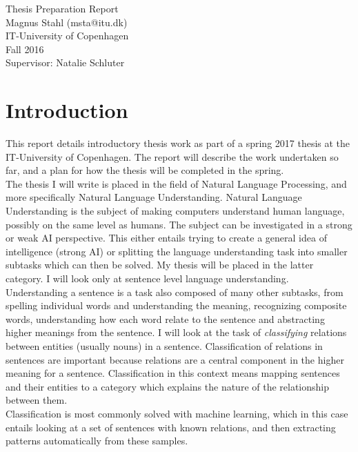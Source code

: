 \documentclass[12pt]{article}
\begin{document}




\begin{center}
    \vspace{2cm}
    \huge { Thesis Preparation Report \\ }
    \vspace{2cm}
    \large {Magnus Stahl (msta@itu.dk)\\
    IT-University of Copenhagen\\
    Fall 2016\\}
    \large {Supervisor: Natalie Schluter\\}
\end{center}


\tableofcontents

\newpage

    
\section{Introduction}
\label{intro}

This report details introductory thesis work as part of a spring 2017 thesis at the IT-University of Copenhagen. The report will describe the work undertaken so far, and a plan for how the thesis will be completed in the spring. \\

The thesis I will write is placed in the field of Natural Language Processing, and more specifically Natural Language Understanding. Natural Language Understanding is the subject of making computers understand human language, possibly on the same level as humans. The subject can be investigated in a strong or weak AI perspective. This either entails trying to create a general idea of intelligence (strong AI) or splitting the language understanding task into smaller subtasks which can then be solved. My thesis will be placed in the latter category. I will look only at sentence level language understanding. Understanding a sentence is a task also composed of many other subtasks, from spelling individual words and understanding the meaning, recognizing composite words, understanding how each word relate to the sentence and abstracting higher meanings from the sentence. I will look at the task of \emph{classifying} relations between entities (usually nouns) in a sentence. Classification of relations in sentences are important because relations are a central component in the higher meaning for a sentence. Classification in this context means mapping sentences and their entities to a category which explains the nature of the relationship between them. \\
Classification is most commonly solved with machine learning, which in this case entails looking at a set of sentences with known relations, and then extracting patterns automatically from these samples. 
\end{document}
